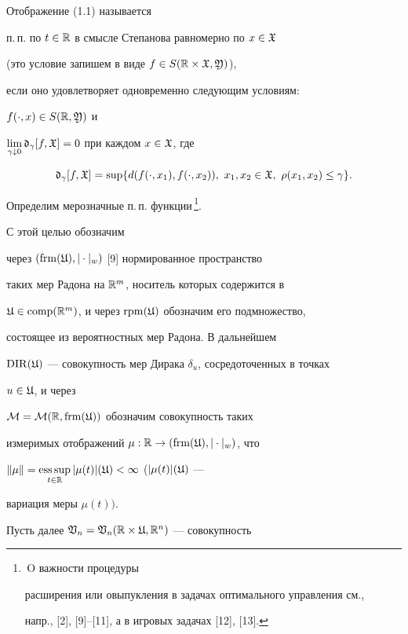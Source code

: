 \begin{defns}


Отображение (1.1) называется


п.\,п. по $t\in\Bbb R$ в смысле Степанова равномерно по $x\in\frak X$


(это условие запишем в виде $f\in S(\Bbb R\times\frak X,\frak Y)$),


если оно удовлетворяет одновременно следующим условиям:


$f(\cdot,x)\in S(\Bbb R,\frak Y)$ и


$\lim\limits_{\gamma\downarrow 0}\frak d_{\gamma}[f,\frak X]=0$ при каждом $x\in\frak X$, где


$$


\gd_{\gamma}[f,\gX]=


\sup\{d(f(\cdot,x_1),f(\cdot,x_2)),


\ x_1, x_2 \in\gX,\ \rho(x_1,x_2)\le \gamma\}.


$$


\end{defns}





Определим мерозначные п.\,п. функции\,\footnote{\,O важности процедуры


расширения или овыпукления в задачах оптимального управления см.,


напр., [2], [9]--[11], а в игровых задачах [12], [13].}.


С этой целью обозначим


через $(\operatorname{frm}(\frak U),|\cdot|_{w})$ [9] нормированное пространство


таких мер Радона на $\Bbb R^{m}$, носитель которых содержится в\linebreak


$\frak U\in\operatorname{comp}(\Bbb R^{m})$, и через $\operatorname{rpm}(\frak U)$ обозначим его подмножество,


состоящее из вероятностных мер Радона. В дальнейшем


$\operatorname{DIR}(\frak U)$ --- совокупность мер Дирака $\delta_{u}$, сосредоточенных в точках


$u\in\frak U$, и через


$\cal M=\cal M(\Bbb R,\operatorname{frm}(\frak U))$ обозначим совокупность таких 


измеримых отображений $\mu:\Bbb R\to(\operatorname{frm}(\frak U),|\cdot|_{w})$, что


$\|\mu\|=\esssup\lt_{t\in\R}|\mu(t)|(\gU)<\infty$ ($|\mu(t)|(\frak U)$ ---


вариация меры $\mu(t))$.


Пусть далее $\frak V_{n}=\frak V_{n}(\Bbb R\times\frak U,\Bbb R^{n})$ --- совокупность


